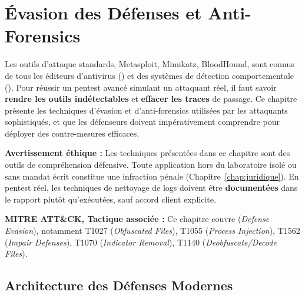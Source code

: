 
\chapter{Évasion des Défenses et Anti-Forensics}
\label{chap:evasion}

Les outils d'attaque standards, Metasploit, Mimikatz, BloodHound, sont
connus de tous les éditeurs d'antivirus () et des systèmes de
détection comportementale (). Pour réussir un pentest avancé
simulant un attaquant réel, il faut savoir \textbf{rendre les outils
indétectables} et \textbf{effacer les traces} de passage. Ce chapitre
présente les techniques d'évasion et d'anti-forensics utilisées par les
attaquants sophistiqués, et que les défenseurs doivent impérativement
comprendre pour déployer des contre-mesures efficaces.

\begin{boxalert}
\textbf{Avertissement éthique :} Les techniques présentées dans ce chapitre
sont des outils de compréhension défensive. Toute application hors du
laboratoire isolé ou sans mandat écrit constitue une infraction pénale
(Chapitre~\ref{chap:juridique}). En pentest réel, les techniques de
nettoyage de logs doivent être \textbf{documentées} dans le rapport
plutôt qu'exécutées, sauf accord client explicite.
\end{boxalert}

\begin{boxinfo}
\textbf{MITRE ATT\&CK, Tactique associée :}
Ce chapitre couvre  (\textit{Defense Evasion}), notamment
T1027 (\textit{Obfuscated Files}), T1055 (\textit{Process Injection}),
T1562 (\textit{Impair Defenses}), T1070 (\textit{Indicator Removal}),
T1140 (\textit{Deobfuscate/Decode Files}).
\end{boxinfo}

\section{Architecture des Défenses Modernes}
\label{sec:defense_architecture}

